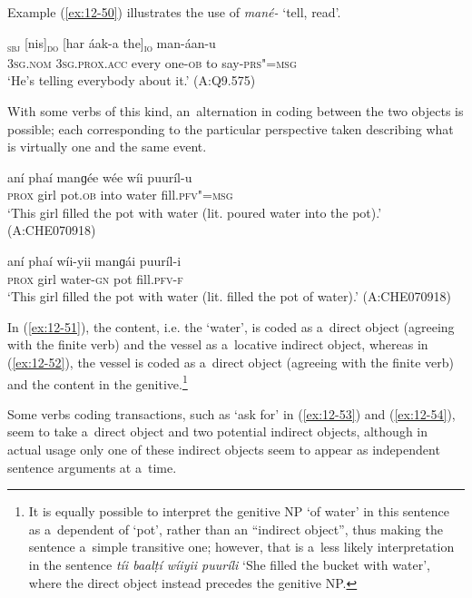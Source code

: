 Example (\ref{ex:12-50}) illustrates the use of \textit{mané-} `tell, read'.

\begin{exe}
\ex
\label{ex:12-50}
\gll [so]\textsubscript{\textsc{sbj}} [nis]\textsubscript{\textsc{do}} [har áak-a the]\textsubscript{\textsc{io}} man-áan-u \\
\textsc{3sg.nom} \textsc{3sg.prox.acc} every one-\textsc{ob} to say-\textsc{prs"=msg} \\
\glt `He's telling everybody about it.' (A:Q9.575)
\end{exe}

With some verbs of this kind, an~alternation in coding between the two objects is possible; each corresponding to the particular perspective taken describing what is virtually one and the same event. 

\begin{exe}
\ex
\label{ex:12-51}
\gll aní phaí manɡée wée wíi puuríl-u \\
\textsc{prox} girl pot.\textsc{ob} into water fill.\textsc{pfv"=msg} \\
\glt `This girl filled the pot with water (lit. poured water into the pot).' (A:CHE070918)
\end{exe}
\begin{exe}
\ex
\label{ex:12-52}
\gll aní phaí wíi-yii manɡái puuríl-i \\
\textsc{prox} girl water-\textsc{gn} pot fill.\textsc{pfv-f} \\
\glt `This girl filled the pot with water (lit. filled the pot of water).' (A:CHE070918)
\end{exe}

In (\ref{ex:12-51}), the content, i.e. the `water', is coded as a~direct object (agreeing with the finite verb) and the vessel as a~locative indirect object, whereas in (\ref{ex:12-52}), the vessel is coded as a~direct object (agreeing with the finite verb) and the content in the genitive.\footnote{It is equally possible to interpret the genitive NP `of water' in this sentence as a~dependent of `pot', rather than an ``indirect object'', thus making the sentence a~simple transitive one; however, that is a~less likely interpretation in the sentence \textit{tíi baalṭí wíiyii puuríli} `She filled the bucket with water', where the direct object instead precedes the genitive NP.} 


Some verbs coding transactions, such as `ask for' in (\ref{ex:12-53}) and (\ref{ex:12-54}), seem to take a~direct object and two potential indirect objects, although in actual usage only one of these indirect objects seem to appear as independent sentence arguments at a~time. 


